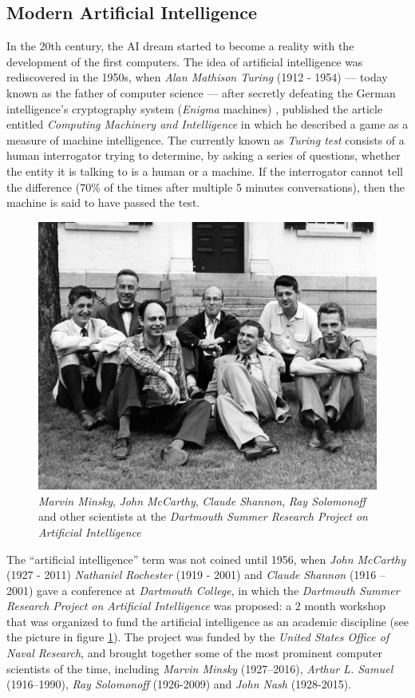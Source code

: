 \subsection{Modern Artificial Intelligence}
In the 20th century, the AI dream started to become a reality with the development of the first computers. The idea of artificial intelligence was rediscovered in the 1950s, when \textit{Alan Mathison Turing} (1912 - 1954) — today known as the father of computer science — after secretly defeating the German intelligence's cryptography system (\textit{Enigma} machines) \cite{Hodges:2000}, published the article entitled \textit{Computing Machinery and Intelligence} \cite{turing1950} in which he described a game as a measure of machine intelligence. The currently known as \textit{Turing test} consists of a human interrogator trying to determine, by asking a series of questions, whether the entity it is talking to is a human or a machine. If the interrogator cannot tell the difference (70\% of the times after multiple 5 minutes conversations), then the machine is said to have passed the test.

\begin{figure}
	\centering
	\includegraphics[width=.6\textwidth]{chapter1/images/dartmouth}
	\caption{\textit{Marvin Minsky}, \textit{John McCarthy}, \textit{Claude Shannon}, \textit{Ray Solomonoff} and other scientists at the \textit{Dartmouth Summer Research Project on Artificial Intelligence}}
	\label{fig:dartmouth_photo}
\end{figure}

The ``artificial intelligence'' term was not coined until 1956, when \textit{John McCarthy} (1927 - 2011) \textit{Nathaniel Rochester} (1919 - 2001) and \textit{Claude Shannon} (1916 – 2001) gave a conference at \textit{Dartmouth College}, in which the \textit{Dartmouth Summer Research Project on Artificial Intelligence} was proposed: a 2 month workshop that was organized to fund the artificial intelligence as an academic discipline (see the picture in figure \ref{fig:dartmouth_photo}). The project was funded by the \textit{United States Office of Naval Research}, and brought together some of the most prominent computer scientists of the time, including \textit{Marvin Minsky} (1927–2016), \textit{Arthur L. Samuel} (1916–1990), \textit{Ray Solomonoff} (1926-2009) and \textit{John Nash} (1928-2015).

